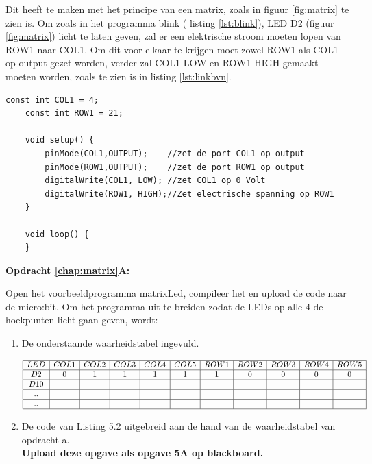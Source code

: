 Dit heeft te maken met het principe van een matrix, zoals in figuur \ref{fig:matrix} te zien is. 
Om zoals in het programma blink ( listing \ref{lst:blink}),  LED D2 (figuur \ref{fig:matrix}) licht te laten geven, zal er een elektrische stroom moeten lopen van ROW1 naar COL1. Om dit voor elkaar te krijgen moet zowel ROW1 als COL1 op output gezet worden, verder zal COL1 \textcolor{arduinoBlue}{LOW} en ROW1 \textcolor{arduinoBlue}{HIGH} gemaakt moeten worden, zoals te zien is in listing \ref{lst:linkbvn}.
\begin{lstlisting}[caption={Zet de linkerboven LED van de matrix aan},label={lst:linkbvn}]
	const int COL1 = 4;   
	const int ROW1 = 21;   
	
	void setup() {
		pinMode(COL1,OUTPUT);    //zet de port COL1 op output
		pinMode(ROW1,OUTPUT);    //zet de port ROW1 op output
		digitalWrite(COL1, LOW); //zet COL1 op 0 Volt
		digitalWrite(ROW1, HIGH);//Zet electrische spanning op ROW1  
	}
	
	void loop() {
	}
\end{lstlisting}

\textbf{Opdracht \ref{chap:matrix}A:}


Open het voorbeeldprogramma matrixLed, compileer het en upload de code naar de micro:bit. Om het programma uit te breiden zodat de LEDs op alle 4 de hoekpunten licht gaan geven, wordt:
	

	\begin{enumerate}[label=(\roman*)]
		\item De onderstaande waarheidstabel ingevuld.
		
\scalebox{0.78} {
           $\begin{array}{|c|c|c|c|c|c|c|c|c|c|c|} \hline
				LED&	COL1 & COL2 &  COL3 &  COL4 &  COL5 &ROW1&ROW2&ROW3&ROW4&ROW5 \\ \hline
				D2&0&1&1&1&1&1&0&0&0&0 \\ \hline
				D10&&&&&&&&&& \\ \hline	
				..&&&&&&&&&& \\ \hline	
				..&&&&&&&&&& \\ \hline	
				
				\end{array}	$ }
		\item De code van Listing 5.2 uitgebreid aan de hand van de waarheidstabel van opdracht a.\\
		\textbf{Upload deze opgave als opgave 5A op blackboard.}
		
	\end{enumerate}


